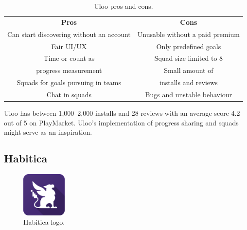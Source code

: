 \begin{table}[h!]
    \centering
    \begin{adjustbox}{width=\textwidth}
        \begin{ctucolortab}
            \begin{tabular}{cc}
                \bfseries Pros & \bfseries Cons\\\Midrule
                Can start discovering without an account & Unusable without a paid premium\\
                Fair UI/UX & Only predefined goals\\
                Time or count as & Squad size limited to 8\\
                progress measurement & Small amount of \\
                Squads for goals pursuing in teams & installs and reviews\\
                Chat in squads & Bugs and unstable behaviour\\
            \end{tabular}
        \end{ctucolortab}
    \end{adjustbox}
    \caption{Uloo pros and cons.}\label{tab:uloo-pros-cons}
\end{table}

Uloo has between 1,000--2,000 installs and 28 reviews with an average score 4.2 out of 5 on PlayMarket.
Uloo's implementation of progress sharing and squads might serve as an inspiration.


\subsection{Habitica}\label{subsec:habitica}

\begin{figure}[h!]
    \includegraphics[width=0.20\textwidth]{images/habitica-logo.png}
    \caption{Habitica logo.\cite{habitica-logo}}
    \label{fig:habitica-logo}
\end{figure}

